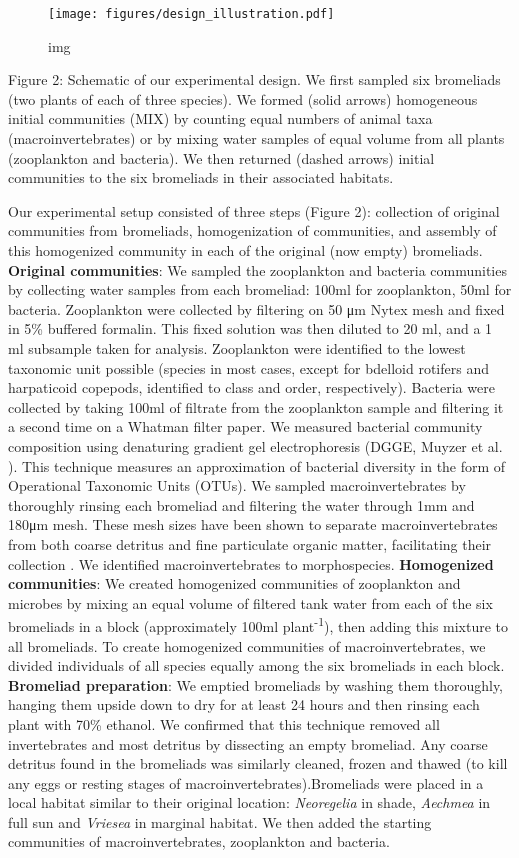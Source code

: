 \begin{figure}[htbp]
\centering
\texttt{[image: figures/design\_illustration.pdf]}
\caption{img}
\end{figure}

Figure 2: Schematic of our experimental design. We first sampled six
bromeliads (two plants of each of three species). We formed (solid
arrows) homogeneous initial communities (MIX) by counting equal numbers
of animal taxa (macroinvertebrates) or by mixing water samples of equal
volume from all plants (zooplankton and bacteria). We then returned
(dashed arrows) initial communities to the six bromeliads in their
associated habitats.

Our experimental setup consisted of three steps (Figure 2): collection
of original communities from bromeliads, homogenization of communities,
and assembly of this homogenized community in each of the original (now
empty) bromeliads. \textbf{Original communities}: We sampled the
zooplankton and bacteria communities by collecting water samples from
each bromeliad: 100ml for zooplankton, 50ml for bacteria. Zooplankton
were collected by filtering on 50 μm Nytex mesh and fixed in 5\%
buffered formalin. This fixed solution was then diluted to 20 ml, and a
1 ml subsample taken for analysis. Zooplankton were identified to the
lowest taxonomic unit possible (species in most cases, except for
bdelloid rotifers and harpaticoid copepods, identified to class and
order, respectively). Bacteria were collected by taking 100ml of
filtrate from the zooplankton sample and filtering it a second time on a
Whatman filter paper. We measured bacterial community composition using
denaturing gradient gel electrophoresis (DGGE, Muyzer et al.
\citeyearpar{Muyzer1993}). This technique measures an approximation of
bacterial diversity in the form of Operational Taxonomic Units (OTUs).
We sampled macroinvertebrates by thoroughly rinsing each bromeliad and
filtering the water through 1mm and 180μm mesh. These mesh sizes have
been shown to separate macroinvertebrates from both coarse detritus and
fine particulate organic matter, facilitating their collection
\citep{Romero2010}. We identified macroinvertebrates to morphospecies.
\textbf{Homogenized communities}: We created homogenized communities of
zooplankton and microbes by mixing an equal volume of filtered tank
water from each of the six bromeliads in a block (approximately 100ml
plant\textsuperscript{-1}), then adding this mixture to all bromeliads.
To create homogenized communities of macroinvertebrates, we divided
individuals of all species equally among the six bromeliads in each
block. \textbf{Bromeliad preparation}: We emptied bromeliads by washing
them thoroughly, hanging them upside down to dry for at least 24 hours
and then rinsing each plant with 70\% ethanol. We confirmed that this
technique removed all invertebrates and most detritus by dissecting an
empty bromeliad. Any coarse detritus found in the bromeliads was
similarly cleaned, frozen and thawed (to kill any eggs or resting stages
of macroinvertebrates).Bromeliads were placed in a local habitat similar
to their original location: \emph{Neoregelia} in shade, \emph{Aechmea}
in full sun and \emph{Vriesea} in marginal habitat. We then added the
starting communities of macroinvertebrates, zooplankton and bacteria.

